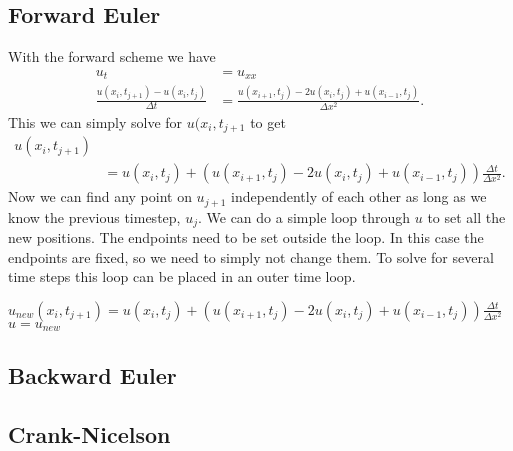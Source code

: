 \subsection{Forward Euler}

With the forward scheme we have
\begin{align*}
    u_t &= u_{xx} \\
    \frac{u(x_i, t_{j+1}) - u(x_i, t_j)}{\Delta t}
    &= \frac{u(x_{i+1}, t_j) - 2u(x_i, t_j) + u(x_{i-1}, t_j)}{\Delta x^2}.
\end{align*}
This we can simply solve for $u(x_i, t_{j+1}$ to get
\begin{align*}
    u(x_i, t_{j+1}) \\
    &= u(x_i, t_j)
    +  \left( u(x_{i+1}, t_j) - 2u(x_i, t_j) + u(x_{i-1}, t_j) \right)
       \frac{\Delta t}{\Delta x^2}.
\end{align*}
Now we can find any point on $u_{j+1}$ independently of each other
as long as we know the previous timestep, $u_j$. We can do a simple
loop through $u$ to set all the new positions. The endpoints need
to be set outside the loop. In this case the endpoints are fixed,
so we need to simply not change them. To solve for several time
steps this loop can be placed in an outer time loop.
\begin{algorithm}
            \State $ u_{new}(x_i, t_{j+1})
                = u(x_i, t_j)
                + \left( u(x_{i+1}, t_j) - 2u(x_i, t_j) + u(x_{i-1}, t_j)
				\right)
                    \frac{\Delta t}{\Delta x^2} $
        \EndFor
        \State $ u = u_{new} $
    \EndFor
\end{algorithm}


\subsection{Backward Euler}


\subsection{Crank-Nicelson}
